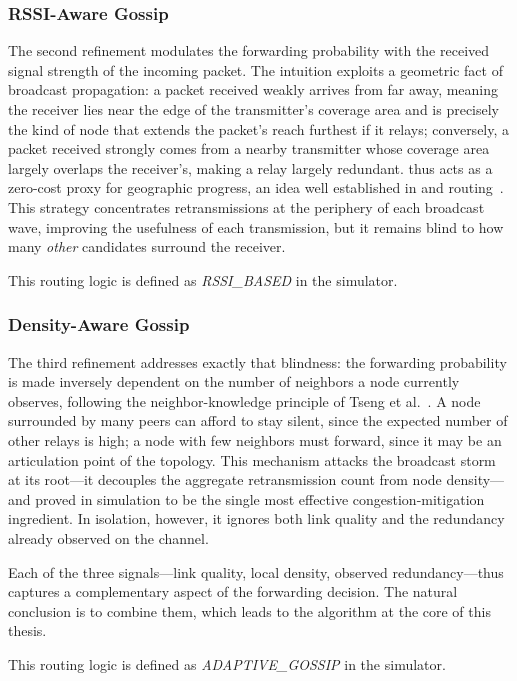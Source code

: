 \documentclass[english,bachelor]{tfgitic}[2026/01/22]
\begin{document}
\subsubsection{RSSI-Aware Gossip}
The second refinement modulates the forwarding probability with the received signal strength of the incoming packet. The intuition exploits a geometric fact of broadcast propagation: a packet received weakly arrives from far away, meaning the receiver lies near the edge of the transmitter's coverage area and is precisely the kind of node that extends the packet's reach furthest if it relays; conversely, a packet received strongly comes from a nearby transmitter whose coverage area largely overlaps the receiver's, making a relay largely redundant.  thus acts as a zero-cost proxy for geographic progress, an idea well established in  and  routing~\cite{senel2011relay,cattani2017reliability}. This strategy concentrates retransmissions at the periphery of each broadcast wave, improving the usefulness of each transmission, but it remains blind to how many \emph{other} candidates surround the receiver.

This routing logic is defined as \emph{RSSI\_BASED} in the simulator.


\subsubsection{Density-Aware Gossip}
The third refinement addresses exactly that blindness: the forwarding probability is made inversely dependent on the number of neighbors a node currently observes, following the neighbor-knowledge principle of Tseng et al.~\cite{tseng2002broadcast}. A node surrounded by many peers can afford to stay silent, since the expected number of other relays is high; a node with few neighbors must forward, since it may be an articulation point of the topology. This mechanism attacks the broadcast storm at its root---it decouples the aggregate retransmission count from node density---and proved in simulation to be the single most effective congestion-mitigation ingredient. In isolation, however, it ignores both link quality and the redundancy already observed on the channel.

Each of the three signals---link quality, local density, observed redundancy---thus captures a complementary aspect of the forwarding decision. The natural conclusion is to combine them, which leads to the algorithm at the core of this thesis.

This routing logic is defined as \emph{ADAPTIVE\_GOSSIP} in the simulator.
\end{document}
